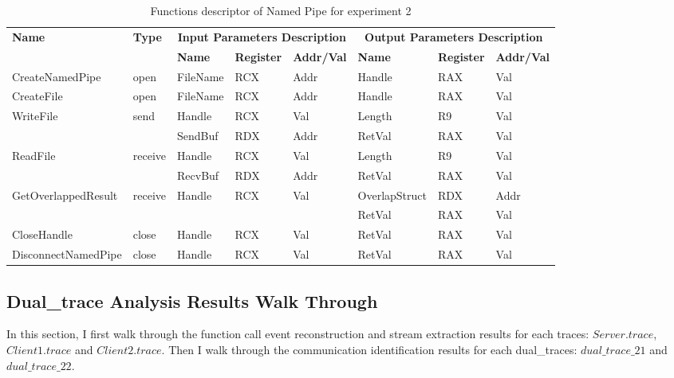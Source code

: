 \documentclass[12pt,oneside]{book}
\begin{document}
\begin{table}[H]
  \centering
  \caption{Functions descriptor of Named Pipe for experiment 2}
  \label{fdescexp2}
\begin{tabular}{|l|l|l|l|l|l|l|l|}
\hline
             \multirow{2}{*}{{\textbf{Name}}} & \multirow{2}{*}{{\textbf{Type}}} & \multicolumn{3}{c|}{\textbf{Input Parameters Description}} & \multicolumn{3}{c|}{\textbf{Output Parameters Description}} \\
              \cline{3-8} 
             & & \textbf{Name}& \textbf{Register} & \textbf{Addr/Val} & \textbf{Name}& \textbf{Register} &  \textbf{Addr/Val}  \\
             \hline
      CreateNamedPipe
       &open & FileName & RCX  & Addr &  Handle & RAX & Val\\
      \hline         
      CreateFile
       &open & FileName & RCX & Addr&  Handle & RAX & Val\\ 
      \hline              
      \multirow{2}{*}{WriteFile}
       &\multirow{2}{*}{send} &  Handle & RCX & Val & Length & R9 & Val\\
        \cline{3-8} 
       & & SendBuf & RDX & Addr & RetVal& RAX & Val\\
      \hline            
      \multirow{2}{*}{ReadFile}
       &\multirow{2}{*}{receive} &  Handle & RCX & Val& Length & R9 & Val\\
        \cline{3-8} 
       & & RecvBuf & RDX  & Addr & RetVal& RAX & Val\\
      \hline    
           \multirow{2}{*}{GetOverlappedResult} &
       \multirow{2}{*}{receive} &  \multirow{2}{*}{Handle} & \multirow{2}{*}{RCX} & \multirow{2}{*}{Val} &OverlapStruct &RDX & Addr\\
               \cline{6-8} 
       & &  &   &  & RetVal& RAX & Val\\
      \hline     
      CloseHandle &
       close &  Handle & RCX & Val & RetVal& RAX & Val\\
      \hline            
      DisconnectNamedPipe &
      close &  Handle & RCX & Val & RetVal& RAX & Val\\
      \hline               
  \end{tabular}  
\end{table} 

\subsection{Dual\_trace Analysis Results Walk Through}
In this section, I first walk through the function call event reconstruction and stream extraction results for each traces: $Server.trace$, $Client1.trace$ and $Client2.trace$. Then I walk through the communication identification results for each dual\_traces: $dual\_trace\_21$ and $dual\_trace\_22$.
\end{document}
